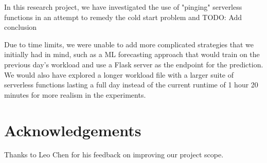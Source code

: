 \documentclass{article}
\begin{document}
In this research project, we have investigated the use of "pinging" serverless functions in an attempt to remedy the cold start problem and TODO: Add conclusion

Due to time limits, we were unable to add more complicated strategies that we initially had in mind, such as a ML forecasting approach that would train on the previous day's workload and use a Flask server as the endpoint for the prediction. We would also have explored a longer workload file with a larger suite of serverless functions lasting a full day instead of the current runtime of 1 hour 20 minutes for more realism in the experiments.

\section{Acknowledgements}

Thanks to Leo Chen for his feedback on improving our project scope.



\end{document}
